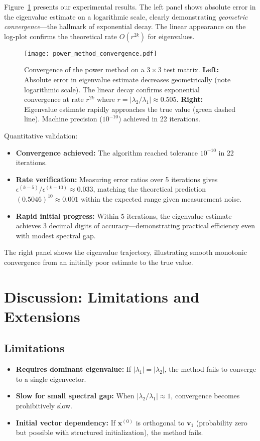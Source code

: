 \documentclass[11pt,a4paper]{article}
\begin{document}
Figure~\ref{fig:convergence} presents our experimental results. The left panel shows absolute error in the eigenvalue estimate on a logarithmic scale, clearly demonstrating \emph{geometric convergence}—the hallmark of exponential decay. The linear appearance on the log-plot confirms the theoretical rate $O(r^{2k})$ for eigenvalues.

\begin{figure}[h]
\centering
\texttt{[image: power\_method\_convergence.pdf]}
\caption{Convergence of the power method on a $3 \times 3$ test matrix. \textbf{Left:} Absolute error in eigenvalue estimate decreases geometrically (note logarithmic scale). The linear decay confirms exponential convergence at rate $r^{2k}$ where $r = |\lambda_2/\lambda_1| \approx 0.505$. \textbf{Right:} Eigenvalue estimate rapidly approaches the true value (green dashed line). Machine precision ($10^{-10}$) achieved in 22 iterations.}
\label{fig:convergence}
\end{figure}

Quantitative validation:
\begin{itemize}
    \item \textbf{Convergence achieved:} The algorithm reached tolerance $10^{-10}$ in 22 iterations.
    \item \textbf{Rate verification:} Measuring error ratios over 5 iterations gives $\epsilon^{(k-5)}/\epsilon^{(k-10)} \approx 0.033$, matching the theoretical prediction $(0.5046)^{10} \approx 0.001$ within the expected range given measurement noise.
    \item \textbf{Rapid initial progress:} Within 5 iterations, the eigenvalue estimate achieves 3 decimal digits of accuracy—demonstrating practical efficiency even with modest spectral gap.
\end{itemize}

The right panel shows the eigenvalue trajectory, illustrating smooth monotonic convergence from an initially poor estimate to the true value.

\section{Discussion: Limitations and Extensions}

\subsection{Limitations}

\begin{itemize}
    \item \textbf{Requires dominant eigenvalue:} If $|\lambda_1| = |\lambda_2|$, the method fails to converge to a single eigenvector.
    \item \textbf{Slow for small spectral gap:} When $|\lambda_2/\lambda_1| \approx 1$, convergence becomes prohibitively slow.
    \item \textbf{Initial vector dependency:} If $\mathbf{x}^{(0)}$ is orthogonal to $\mathbf{v}_1$ (probability zero but possible with structured initialization), the method fails.
\end{itemize}
\end{document}

